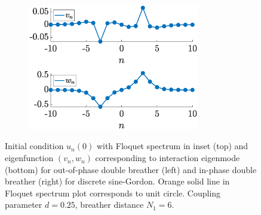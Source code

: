 \documentclass[12pt,reqno]{amsart}
\theoremstyle{definition}
\begin{document}
\begin{figure}
\begin{center}
	\begin{subfigure}{0.45\linewidth}
		\caption{}
		\includegraphics[width=7.5cm]{doubleppinteig.eps}
		\label{fig:doubled}
	\end{subfigure}
	\end{center}
	\caption{Initial condition $u_n(0)$ with Floquet spectrum in inset (top) and eigenfunction $(v_n, w_n)$ corresponding to interaction eigenmode (bottom) for out-of-phase double breather (left) and in-phase double breather (right) for discrete sine-Gordon. Orange solid line in Floquet spectrum plot corresponds to unit circle. Coupling parameter $d = 0.25$, breather distance $N_1 = 6$.}
	\label{fig:double}
\end{figure}
\end{document}
